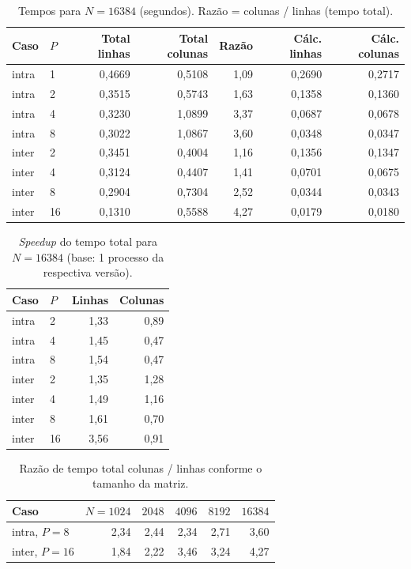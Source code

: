 \documentclass[a4paper,12pt]{article}
\begin{document}
\begin{table}[h!]
\centering
\small
\caption{Tempos para $N = 16384$ (segundos). Razão = colunas / linhas (tempo total).}
\label{tab:n16384}
\begin{tabular}{llrrrrr}
\toprule
Caso & $P$ & Total linhas & Total colunas & Razão & Cálc. linhas & Cálc. colunas \\
\midrule
intra & 1  & 0,4669 & 0,5108 & 1,09 & 0,2690 & 0,2717 \\
intra & 2  & 0,3515 & 0,5743 & 1,63 & 0,1358 & 0,1360 \\
intra & 4  & 0,3230 & 1,0899 & 3,37 & 0,0687 & 0,0678 \\
intra & 8  & 0,3022 & 1,0867 & 3,60 & 0,0348 & 0,0347 \\
\midrule
inter & 2  & 0,3451 & 0,4004 & 1,16 & 0,1356 & 0,1347 \\
inter & 4  & 0,3124 & 0,4407 & 1,41 & 0,0701 & 0,0675 \\
inter & 8  & 0,2904 & 0,7304 & 2,52 & 0,0344 & 0,0343 \\
inter & 16 & 0,1310 & 0,5588 & 4,27 & 0,0179 & 0,0180 \\
\bottomrule
\end{tabular}
\end{table}

\begin{table}[h!]
\centering
\small
\caption{\emph{Speedup} do tempo total para $N = 16384$ (base: 1 processo da respectiva versão).}
\label{tab:speedup}
\begin{tabular}{llrr}
\toprule
Caso & $P$ & Linhas & Colunas \\
\midrule
intra & 2  & 1,33 & 0,89 \\
intra & 4  & 1,45 & 0,47 \\
intra & 8  & 1,54 & 0,47 \\
\midrule
inter & 2  & 1,35 & 1,28 \\
inter & 4  & 1,49 & 1,16 \\
inter & 8  & 1,61 & 0,70 \\
inter & 16 & 3,56 & 0,91 \\
\bottomrule
\end{tabular}
\end{table}

\begin{table}[h!]
\centering
\small
\caption{Razão de tempo total colunas / linhas conforme o tamanho da matriz.}
\label{tab:razao}
\begin{tabular}{lrrrrr}
\toprule
Caso & $N=1024$ & $2048$ & $4096$ & $8192$ & $16384$ \\
\midrule
intra, $P=8$  & 2,34 & 2,44 & 2,34 & 2,71 & 3,60 \\
inter, $P=16$ & 1,84 & 2,22 & 3,46 & 3,24 & 4,27 \\
\bottomrule
\end{tabular}
\end{table}
\end{document}
